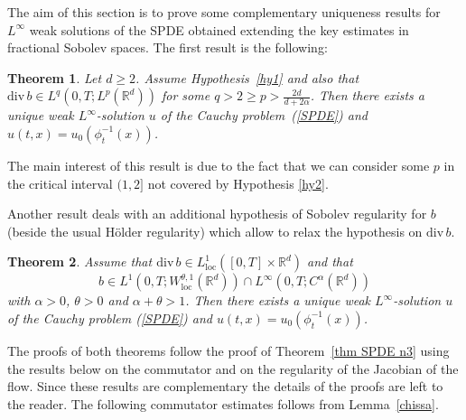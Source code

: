\documentclass[a4paper,11pt]{article}
\newtheorem{theorem}{Theorem}
\newcommand{\RR}{\mathbb{R}}
\newcommand{\loc}{\mathrm{loc}}
\begin{document}
The aim of this section is to prove some complementary uniqueness results for $L^\infty$ weak solutions of the SPDE obtained extending the key estimates in fractional Sobolev spaces. The first result is the following:


\begin{theorem}
\label{thm:aux-1} Let $d \ge 2$. Assume Hypothesis~\ref{hy1}
and also  that
$
{\mathrm{div}\,}b\in L^{q} (0,T;L^{p}(\mathbb{R}^{d}))
$
 for some $q>2 \ge p > \frac{2d}{ d + 2 \alpha}$. Then there exists a unique weak
$L^{\infty}$-solution $u$ of the Cauchy problem~(\ref{SPDE}) and
$
u(t,x)=u_{0}({\phi}_{t}^{-1}( x))
$.
\end{theorem}

The main interest of this result is due to the fact that
   we can consider some $p$ in the critical interval
   $ (1,2]$ not covered by Hypothesis \ref{hy2}.

Another result deals with an additional hypothesis of Sobolev regularity for $b$ (beside the usual H\"older regularity) which allow to relax the hypothesis on $\mathrm{div}\,b$.

\begin{theorem}
\label{thm:aux-2}
 Assume that $\mathrm{div}\, b\in
L^1_\loc([0,T]\times\RR^d)$ and that
$$
  b \in L^1 (0,T; W_{\loc}^{\theta, 1} (\RR^d) ) \cap L^\infty (0,T; C^{\alpha} (\RR^d) )
$$
with $\alpha>0$, $\theta>0$ and $\alpha+\theta>1$. Then
 there exists a unique weak $L^{\infty}$-solution $u$ of the
Cauchy problem (\ref{SPDE}) and
$
u(t,x)=u_{0}({\phi}_{t}^{-1}( x))
$.
\end{theorem}

The proofs of both theorems follow the proof of Theorem~\ref{thm SPDE n3} using the results below on the commutator and on the regularity of the Jacobian of the flow. Since these results are complementary the details of the proofs are left to the reader. The following commutator estimates follows from Lemma~\ref{chissa}.
\end{document}
